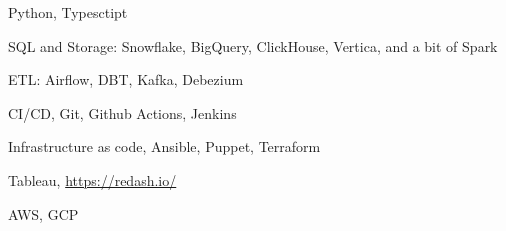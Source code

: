 \item Python, Typesctipt
\item SQL and Storage: Snowflake, BigQuery, ClickHouse, Vertica, and a bit of
  Spark
\item ETL: Airflow, DBT, Kafka, Debezium
\item CI/CD, Git, Github Actions, Jenkins
\item Infrastructure as code, Ansible, Puppet, Terraform
\item Tableau, \href{Redash}{https://redash.io/}
\item AWS, GCP
